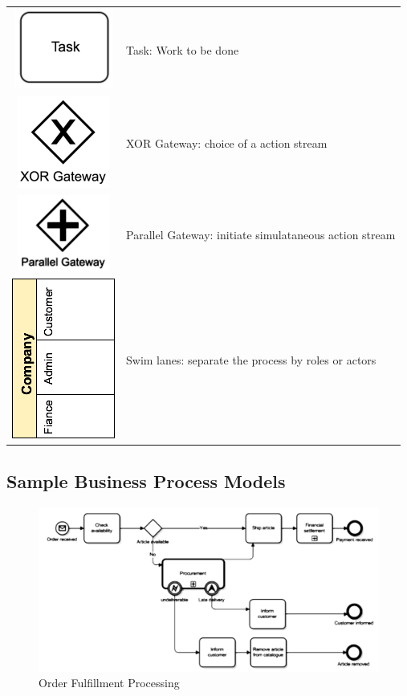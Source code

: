 \documentclass[]{book}
\begin{document}
\begin{longtable}[]{@{}cl@{}}
\includegraphics{images/task.png} & Task: Work to be done\tabularnewline
\includegraphics{images/xor-gateway.png} & XOR Gateway: choice of a action stream\tabularnewline
\includegraphics{images/parallel-gateway.png} & Parallel Gateway: initiate simulataneous action stream\tabularnewline
\includegraphics{images/swimlanes.png} & Swim lanes: separate the process by roles or actors\tabularnewline
\bottomrule
\end{longtable}

\hypertarget{sample-business-process-models}{%
\subsection{Sample Business Process Models}\label{sample-business-process-models}}

\begin{figure}
\centering
\includegraphics{images/orderfulfillment.png}
\caption{Order Fulfillment Processing}
\end{figure}
\end{document}

